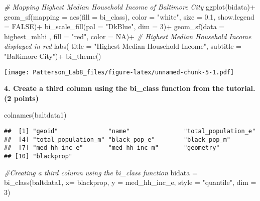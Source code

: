 \documentclass[
]{article}
\newenvironment{Shaded}{\begin{snugshade}}{\end{snugshade}}
\newcommand{\AttributeTok}[1]{\textcolor[rgb]{0.77,0.63,0.00}{#1}}
\newcommand{\CommentTok}[1]{\textcolor[rgb]{0.56,0.35,0.01}{\textit{#1}}}
\newcommand{\ConstantTok}[1]{\textcolor[rgb]{0.00,0.00,0.00}{#1}}
\newcommand{\DecValTok}[1]{\textcolor[rgb]{0.00,0.00,0.81}{#1}}
\newcommand{\FloatTok}[1]{\textcolor[rgb]{0.00,0.00,0.81}{#1}}
\newcommand{\FunctionTok}[1]{\textcolor[rgb]{0.00,0.00,0.00}{#1}}
\newcommand{\NormalTok}[1]{#1}
\newcommand{\OtherTok}[1]{\textcolor[rgb]{0.56,0.35,0.01}{#1}}
\newcommand{\SpecialCharTok}[1]{\textcolor[rgb]{0.00,0.00,0.00}{#1}}
\newcommand{\StringTok}[1]{\textcolor[rgb]{0.31,0.60,0.02}{#1}}
\begin{document}
\begin{Shaded}
\begin{Highlighting}[]
\CommentTok{\# Mapping Highest Median Household Income of Baltimore City}
\FunctionTok{ggplot}\NormalTok{(bidata)}\SpecialCharTok{+}
  \FunctionTok{geom\_sf}\NormalTok{(}\AttributeTok{mapping =} \FunctionTok{aes}\NormalTok{(}\AttributeTok{fill =}\NormalTok{ bi\_class), }\AttributeTok{color =} \StringTok{"white"}\NormalTok{, }\AttributeTok{size =} \FloatTok{0.1}\NormalTok{, }\AttributeTok{show.legend =} \ConstantTok{FALSE}\NormalTok{)}\SpecialCharTok{+}
  \FunctionTok{bi\_scale\_fill}\NormalTok{(}\AttributeTok{pal =} \StringTok{"DkBlue"}\NormalTok{, }\AttributeTok{dim =} \DecValTok{3}\NormalTok{)}\SpecialCharTok{+}
  \FunctionTok{geom\_sf}\NormalTok{(}\AttributeTok{data =}\NormalTok{ highest\_mhhi , }\AttributeTok{fill =} \StringTok{"red"}\NormalTok{, }\AttributeTok{color =} \ConstantTok{NA}\NormalTok{)}\SpecialCharTok{+} \CommentTok{\# Highest Median Household Income displayed in red}
  \FunctionTok{labs}\NormalTok{(}
    \AttributeTok{title =} \StringTok{"Highest Median Household Income"}\NormalTok{,}
    \AttributeTok{subtitle =} \StringTok{"Baltimore City"}\NormalTok{)}\SpecialCharTok{+}
  \FunctionTok{bi\_theme}\NormalTok{()}
\end{Highlighting}
\end{Shaded}

\texttt{[image: Patterson\_Lab8\_files/figure-latex/unnamed-chunk-5-1.pdf]}

\textbf{4. Create a third column using the bi\_class function from the
tutorial. (2 points)}

\begin{Shaded}
\begin{Highlighting}[]
\FunctionTok{colnames}\NormalTok{(baltdata1)}
\end{Highlighting}
\end{Shaded}

\begin{verbatim}
##  [1] "geoid"              "name"               "total_population_e"
##  [4] "total_population_m" "black_pop_e"        "black_pop_m"       
##  [7] "med_hh_inc_e"       "med_hh_inc_m"       "geometry"          
## [10] "blackprop"
\end{verbatim}

\begin{Shaded}
\begin{Highlighting}[]
\CommentTok{\#Creating a third column using the bi\_class function}
\NormalTok{bidata }\OtherTok{=} \FunctionTok{bi\_class}\NormalTok{(baltdata1, }\AttributeTok{x=}\NormalTok{ blackprop, }\AttributeTok{y =}\NormalTok{ med\_hh\_inc\_e, }\AttributeTok{style =} \StringTok{"quantile"}\NormalTok{, }\AttributeTok{dim =} \DecValTok{3}\NormalTok{)}
\end{Highlighting}
\end{Shaded}
\end{document}
